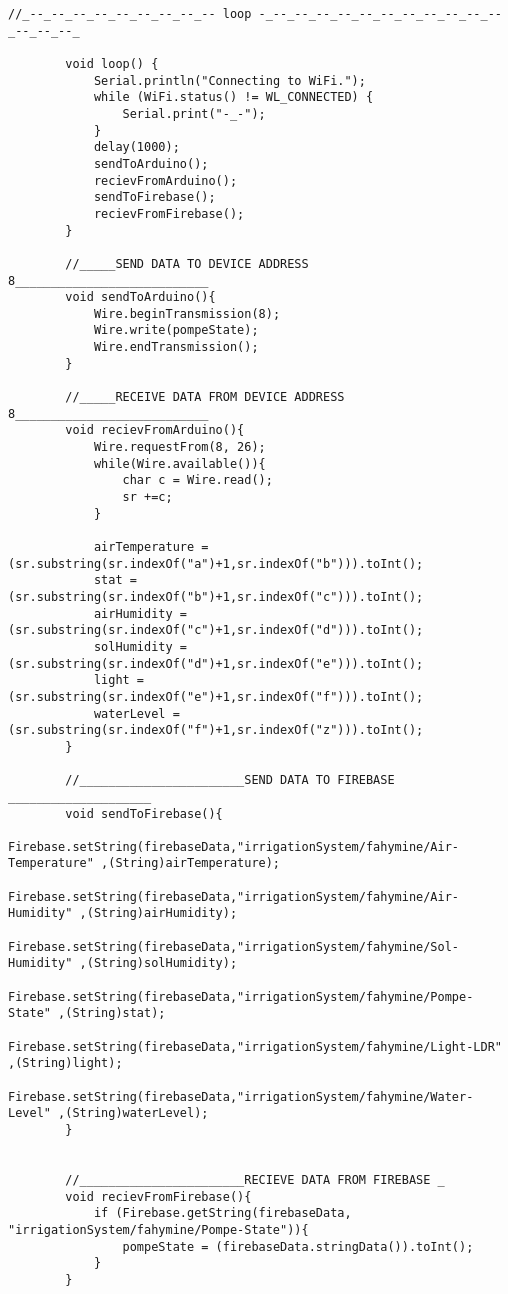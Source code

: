 \begin{flushleft}
\begin{lstlisting}[style=CStyle]
		//_--_--_--_--_--_--_--_--_-- loop -_--_--_--_--_--_--_--_--_--_--_--_--_--_--_
		
		void loop() {
			Serial.println("Connecting to WiFi.");
			while (WiFi.status() != WL_CONNECTED) {
				Serial.print("-_-");
			}
			delay(1000);
			sendToArduino();
			recievFromArduino();
			sendToFirebase();
			recievFromFirebase();
		}
		
		//_____SEND DATA TO DEVICE ADDRESS 8___________________________
		void sendToArduino(){
			Wire.beginTransmission(8); 
			Wire.write(pompeState);  
			Wire.endTransmission(); 
		}
		
		//_____RECEIVE DATA FROM DEVICE ADDRESS 8___________________________
		void recievFromArduino(){
			Wire.requestFrom(8, 26); 
			while(Wire.available()){
				char c = Wire.read();
				sr +=c;
			}
			
			airTemperature = (sr.substring(sr.indexOf("a")+1,sr.indexOf("b"))).toInt();
			stat = (sr.substring(sr.indexOf("b")+1,sr.indexOf("c"))).toInt();
			airHumidity = (sr.substring(sr.indexOf("c")+1,sr.indexOf("d"))).toInt();
			solHumidity = (sr.substring(sr.indexOf("d")+1,sr.indexOf("e"))).toInt();
			light =(sr.substring(sr.indexOf("e")+1,sr.indexOf("f"))).toInt();
			waterLevel =(sr.substring(sr.indexOf("f")+1,sr.indexOf("z"))).toInt();
		}
		
		//_______________________SEND DATA TO FIREBASE ____________________
		void sendToFirebase(){
			Firebase.setString(firebaseData,"irrigationSystem/fahymine/Air-Temperature" ,(String)airTemperature);
			Firebase.setString(firebaseData,"irrigationSystem/fahymine/Air-Humidity" ,(String)airHumidity);
			Firebase.setString(firebaseData,"irrigationSystem/fahymine/Sol-Humidity" ,(String)solHumidity);
			Firebase.setString(firebaseData,"irrigationSystem/fahymine/Pompe-State" ,(String)stat);
			Firebase.setString(firebaseData,"irrigationSystem/fahymine/Light-LDR" ,(String)light);
			Firebase.setString(firebaseData,"irrigationSystem/fahymine/Water-Level" ,(String)waterLevel);
		}
		
		
		//_______________________RECIEVE DATA FROM FIREBASE _
		void recievFromFirebase(){
			if (Firebase.getString(firebaseData, "irrigationSystem/fahymine/Pompe-State")){
				pompeState = (firebaseData.stringData()).toInt();
			}
		}
	\end{lstlisting}
\end{flushleft}